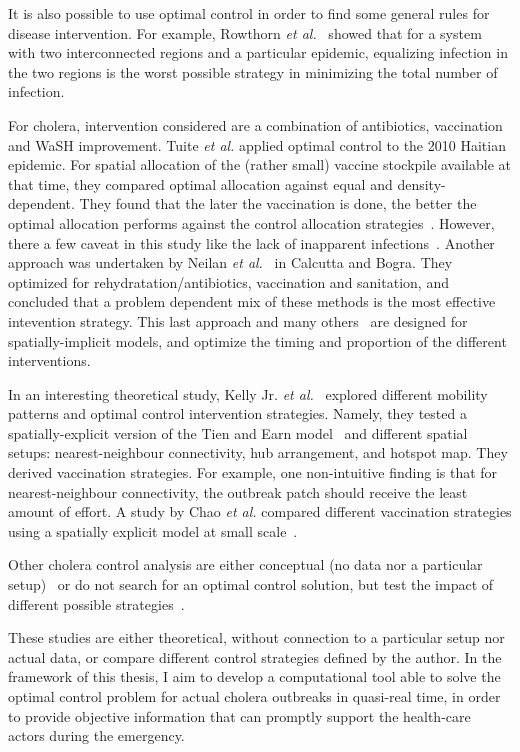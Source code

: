It is also possible to use optimal control in order to find some general rules for disease intervention. For example, Rowthorn \textit{et al.}~\cite{rowthorn_optimal_2009} showed that for a system with two interconnected regions and a particular epidemic, equalizing infection in the two regions is the worst possible strategy in minimizing the total number of infection.

For cholera, intervention considered are a combination of antibiotics, vaccination and WaSH improvement. Tuite \textit{et al.} applied optimal control to the 2010 Haitian epidemic. For spatial allocation of the (rather small) vaccine stockpile available at that time, they compared optimal allocation against equal and density-dependent. They found that the later the vaccination is done, the better the optimal allocation performs against the control allocation strategies~\cite{tuite_cholera_2011}. However, there a few caveat in this study like the lack of inapparent infections~\cite{king_inapparent_2008, rinaldo_reassessment_2012}. Another approach was undertaken by Neilan \textit{et al.}~\cite{millerneilan_modeling_2010} in Calcutta and Bogra. They optimized for rehydratation/antibiotics, vaccination and sanitation, and concluded that a problem dependent mix of these methods is the most effective intevention strategy. This last approach and many others~\cite{sardar_optimal_2013} are designed for spatially-implicit models, and optimize the timing and proportion of the different interventions.

In an interesting theoretical study, Kelly Jr. \textit{et al.}~\cite{kelly_impact_2016} explored different mobility patterns and  optimal control intervention strategies. Namely, they tested a spatially-explicit version of the Tien and Earn model~\cite{tien_multiple_2010} and different spatial setups: nearest-neighbour connectivity, hub arrangement, and  hotspot map. They derived vaccination strategies. For example, one non-intuitive finding is that for nearest-neighbour connectivity, the outbreak patch should receive the least amount of effort.  A study by Chao \textit{et al.} compared different vaccination strategies using a spatially explicit model at small scale~\cite{chao_vaccination_2011}.  

Other cholera control analysis are either conceptual (no data nor a particular setup)~\cite{fister_optimal_2016} or do not search for an optimal control solution, but test the impact of different possible  strategies~\cite{kirpich_controlling_2017, eubank_modelling_2004, finger_potential_2018, seidlein_preventing_2018,azman_micro-hotspots_2018,lessler_mapping_2018,rebaudet_dry_2013}.

These studies are either theoretical, without connection to a particular setup nor actual data, or compare different control strategies defined by the author. In the framework of this thesis, I aim to develop a computational tool able to solve the optimal control problem for actual cholera outbreaks in quasi-real time, in order to provide objective information that can promptly support the health-care actors during the emergency. 


